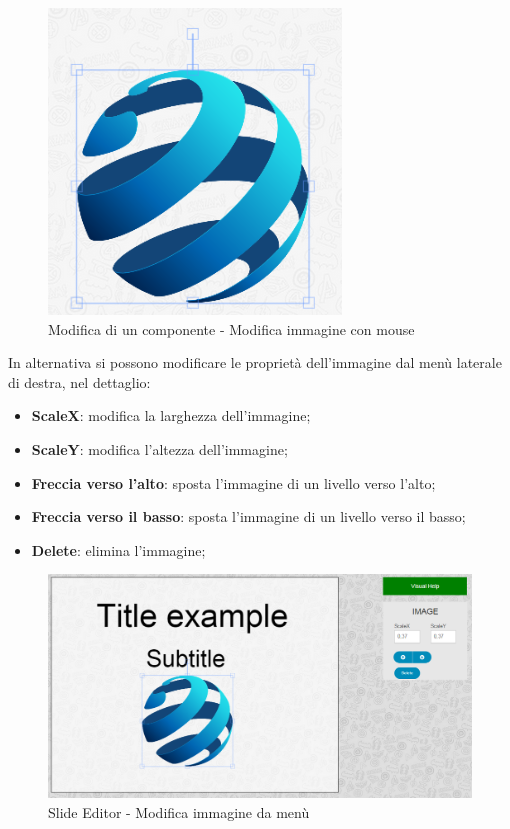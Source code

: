 \begin{figure}[H] 
	\centering 
	\includegraphics[scale=0.80] {img/img_anchor.png}
	\caption{Modifica di un componente - Modifica immagine con mouse} 
\end{figure}

\noindent In alternativa si possono modificare le proprietà dell'immagine dal menù laterale di destra, nel dettaglio:

		\begin{itemize}
			\item \textbf{ScaleX}: modifica la larghezza dell'immagine;
			\item \textbf{ScaleY}: modifica l'altezza dell'immagine;
			\item \textbf{Freccia verso l'alto}: sposta l'immagine di un livello verso l'alto;
			\item \textbf{Freccia verso il basso}: sposta l'immagine di un livello verso il basso;
			\item \textbf{Delete}: elimina l'immagine;
		\end{itemize}
		
\begin{figure}[H] 
	\centering 
	\includegraphics[scale=0.40] {img/img_edit.png}
	\caption{\gls{Slide} Editor - Modifica immagine da menù} 
\end{figure}	


